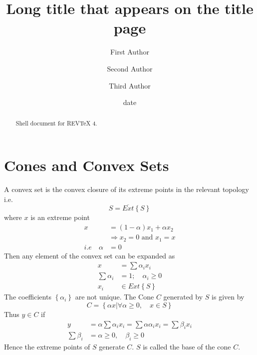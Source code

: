 \documentclass[aps,preprint]{revtex4}%
\begin{document}
\title[Short title for running header]{Long title that appears on the title page}
\author{First Author}
\author{Second Author}
\author{Third Author}

\begin{abstract}
Shell document for REV\TeX{} 4.

\end{abstract}
\date[Date text]{date}




\maketitle
\tableofcontents


\section{Cones and Convex Sets}

A convex set is the convex closure of its extreme points in the relevant
topology i.e.%
\begin{equation}
S=\overline{Ext}\left\{  S\right\}
\end{equation}
where $x$ is an extreme point
\begin{align}
x &  =\left(  1-\alpha\right)  x_{1}+\alpha x_{2}\\
&  \Longrightarrow x_{2}=0\text{ and }x_{1}=x\\
i.e\quad\alpha &  =0
\end{align}
Then any element of the convex set can be expanded as
\begin{align}
x &  =\sum\alpha_{i}x_{i}\\
\sum\alpha_{i} &  =1;\quad\alpha_{i}\geq0\\
x_{i} &  \in Ext\left\{  S\right\}
\end{align}
The coefficients $\left\{  \alpha_{i}\right\}  $ are not unique. The Cone $C$
generated by $S$ is given by
\begin{equation}
C=\left\{  \alpha x|\forall\alpha\geq0,\quad x\in S\right\}
\end{equation}
Thus $y\in C$ if
\begin{align}
y &  =\alpha\sum\alpha_{i}x_{i}=\sum\alpha\alpha_{i}x_{i}=\sum\beta_{i}x_{i}\\
\sum\beta_{i} &  =\alpha\geq0,\quad\beta_{i}\geq0
\end{align}
Hence the extreme points of $S$ generate $C$. $S$ is called the base of the
cone $C$.
\end{document}
